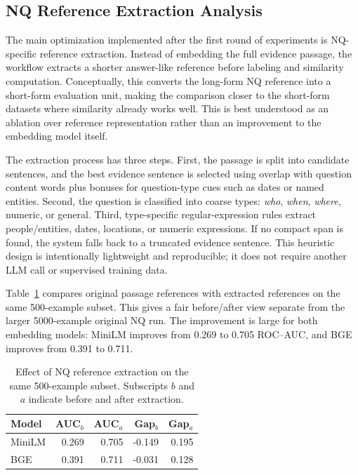 \documentclass[11pt]{article}
\begin{document}
\subsection{NQ Reference Extraction Analysis}

The main optimization implemented after the first round of experiments is NQ-specific reference extraction. Instead of embedding the full evidence passage, the workflow extracts a shorter answer-like reference before labeling and similarity computation. Conceptually, this converts the long-form NQ reference into a short-form evaluation unit, making the comparison closer to the short-form datasets where similarity already works well. This is best understood as an ablation over reference representation rather than an improvement to the embedding model itself.

The extraction process has three steps. First, the passage is split into candidate sentences, and the best evidence sentence is selected using overlap with question content words plus bonuses for question-type cues such as dates or named entities. Second, the question is classified into coarse types: \textit{who}, \textit{when}, \textit{where}, numeric, or general. Third, type-specific regular-expression rules extract people/entities, dates, locations, or numeric expressions. If no compact span is found, the system falls back to a truncated evidence sentence. This heuristic design is intentionally lightweight and reproducible; it does not require another LLM call or supervised training data.

Table~\ref{tab:nq-improvement} compares original passage references with extracted references on the same 500-example subset. This gives a fair before/after view separate from the larger 5000-example original NQ run. The improvement is large for both embedding models: MiniLM improves from 0.269 to 0.705 ROC--AUC, and BGE improves from 0.391 to 0.711.

\begin{table}[t]
\centering
\small
\begin{tabular}{lrrrr}
\toprule
Model & AUC$_b$ & AUC$_a$ & Gap$_b$ & Gap$_a$ \\
\midrule
MiniLM & 0.269 & 0.705 & -0.149 & 0.195 \\
BGE & 0.391 & 0.711 & -0.031 & 0.128 \\
\bottomrule
\end{tabular}
\caption{Effect of NQ reference extraction on the same 500-example subset. Subscripts $b$ and $a$ indicate before and after extraction.}
\label{tab:nq-improvement}
\end{table}
\end{document}
